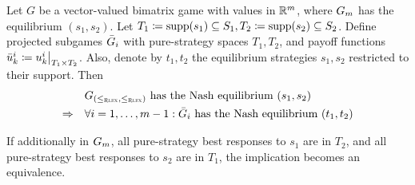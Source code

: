 \documentclass[a4paper]{scrreprt}
\begin{document}
    \begin{thm}
        Let $G$ be a vector-valued bimatrix game with values in $\mathbb{R}^m$, where $G_{m}$ has the equilibrium $(s_1, s_2)$.
        Let $T_1 \coloneqq \operatorname{supp}(s_1) \subseteq S_1, T_2 \coloneqq \operatorname{supp}(s_2) \subseteq S_2$.
        Define projected subgames $\bar{G}_{i}$ with pure-strategy spaces $T_1, T_2$, and payoff functions $\bar{u}_k^i \coloneqq \restr{u_k^i}{T_1 \times T_2}$.
        Also, denote by $t_1, t_2$ the equilibrium strategies $s_1, s_2$ restricted to their support.
        Then
        \begin{align}
                             &G_{(\leq_{\textsc{Rlex}},\leq_{\textsc{Rlex}})} \text{ has the Nash equilibrium } (s_1, s_2) \nonumber \\
            \Rightarrow\quad &\forall i = 1, \dots, m-1: \bar{G}_{i} \text{ has the Nash equilibrium } (t_1, t_2) 
            \label{eq:allProjectedSubgamesHaveTheNashEquilibrium}
        \end{align}   
        \label{thm:rlexGameProjectedSubgameCharacterization}
        
        If additionally in $G_{m}$,
        all pure-strategy best responses to $s_1$ are in $T_2$, and all pure-strategy best responses to $s_2$ are in $T_1$,
        the implication becomes an equivalence.
    \end{thm}
\end{document}
